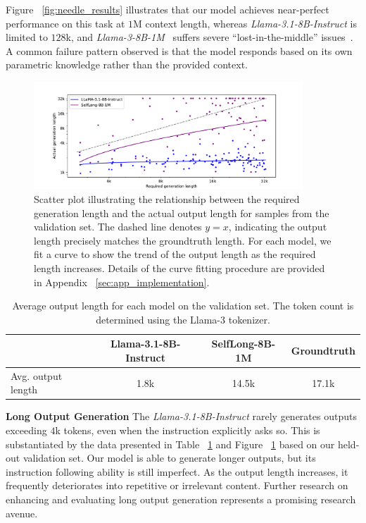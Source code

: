 \documentclass{article}
\begin{document}
Figure ~\ref{fig:needle_results} illustrates that our model achieves near-perfect performance on this task at $1$M context length,
whereas \emph{Llama-3.1-8B-Instruct} is limited to $128$k,
and \emph{Llama-3-8B-1M}~\citep{gradientlongcontextllama3} suffers severe ``lost-in-the-middle'' issues~\citep{liu2024lost}.
A common failure pattern observed is that the model responds based on its own parametric knowledge rather than the provided context.

\begin{figure}[ht]
\centering
\includegraphics[width=0.9\textwidth]{long_output_scatter}
\caption{Scatter plot illustrating the relationship between the required generation length and the actual output length for samples from the validation set.
The dashed line denotes $y=x$,
indicating the output length precisely matches the groundtruth length.
For each model, we fit a curve to show the trend of the output length as the required length increases.
Details of the curve fitting procedure are provided in Appendix ~\ref{sec:app_implementation}.}
\label{fig:long_output_results}
\end{figure}

\begin{table}[ht]
\centering
\caption{Average output length for each model on the validation set.
The token count is determined using the Llama-3 tokenizer.}
\begin{tabular}{lccc}
\hline
                     & Llama-3.1-8B-Instruct & SelfLong-8B-1M & Groundtruth \\ \hline
Avg. output length       &      1.8k        &       14.5k      &   17.1k          \\ \hline
\end{tabular}
\label{tab:long_output_eval}
\end{table}

\noindent
\textbf{Long Output Generation}
The \emph{Llama-3.1-8B-Instruct} rarely generates outputs exceeding $4$k tokens,
even when the instruction explicitly asks so.
This is substantiated by the data presented in Table ~\ref{tab:long_output_eval} and Figure ~\ref{fig:long_output_results}
based on our held-out validation set.
Our model is able to generate longer outputs,
but its instruction following ability is still imperfect.
As the output length increases,
it frequently deteriorates into repetitive or irrelevant content.
Further research on enhancing and evaluating long output generation represents a promising research avenue.
\end{document}

